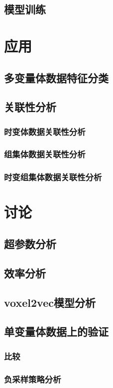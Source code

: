 \subsection{模型训练}

\section{应用}
\subsection{多变量体数据特征分类}
\subsection{关联性分析}
\subsubsection{时变体数据关联性分析}
\subsubsection{组集体数据关联性分析}
\subsubsection{时变组集体数据关联性分析}

\section{讨论}
\subsection{超参数分析}
\subsection{效率分析}
\subsection{voxel2vec模型分析}
\subsection{单变量体数据上的验证}
\subsubsection{比较}
\subsubsection{负采样策略分析}
